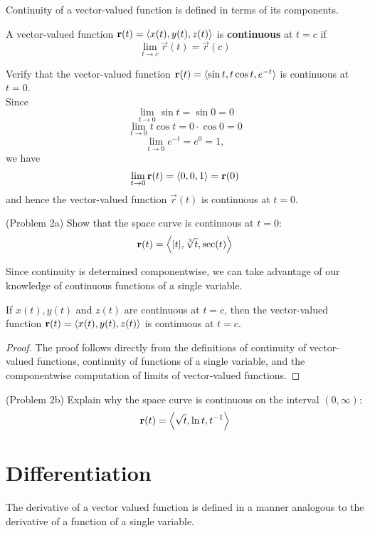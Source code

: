 \documentclass[handout]{ximera}
\begin{document}
Continuity of a vector-valued function is defined in terms of its components.

\begin{definition}
A vector-valued function $\mathbf r(t) = \left\langle x(t), y(t), z(t)\right\rangle$ is
\textbf{continuous} at $t = c$ if
\[
\lim_{t \to c} \vec r(t) = \vec r(c)
\]
\end{definition}


\begin{example}[Example 2]
Verify that the vector-valued function $\mathbf r(t) = \left\langle \sin t, t \cos t, e^{-t}\right\rangle$ is continuous at $t = 0$.\\
Since
\[
\lim_{t \to 0} \sin t =  \sin 0 = 0
\]
\[
\lim_{t \to 0} t \cos t =  0 \cdot \cos 0 = 0
\]
\[
\lim_{t \to 0} e^{-t} =  e^0 = 1,
\]
we have
\[
\lim_{t \to 0} \mathbf r(t) = \left\langle 0, 0, 1\right\rangle = \mathbf r(0)
\]
and hence the vector-valued function $\vec r(t)$ is continuous at $t = 0$.

\end{example}

\begin{problem}(Problem 2a)
Show that the space curve is continuous at $t = 0$:
\[
\mathbf r(t) = \left\langle |t|,\sqrt[3] t, \sec(t)\right\rangle
\]
\end{problem}

Since continuity is determined componentwise, we can take advantage of our knowledge of 
continuous functions of a single variable.

\begin{proposition}[Continuity]
If $x(t), y(t)$ and $z(t)$ are continuous at $t = c$, then the vector-valued function $\mathbf r(t) = \left\langle x(t), y(t), z(t)\right\rangle$
is continuous at $t = c$.
\end{proposition}
\begin{proof}
The proof follows directly from the definitions of continuity of vector-valued functions, continuity of functions of a single 
variable, and the componentwise computation of limits of vector-valued functions.
\end{proof}

\begin{problem}(Problem 2b)
Explain why the space curve is continuous on the interval $(0, \infty)$:
\[
\mathbf r(t) = \left\langle  \sqrt t, \ln t, t^{-1}\right\rangle
\]
\end{problem}

\section{Differentiation}
The derivative of a vector valued function is defined in a manner analogous to the derivative of a function of a single variable.
\end{document}
